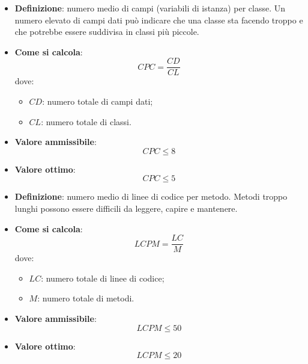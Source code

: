 \begin{itemize}
	\item \textbf{Definizione}: numero medio di campi (variabili di istanza) per classe. Un numero elevato di campi dati può indicare che una classe sta facendo troppo e che potrebbe essere suddivisa in classi più piccole.
	\item \textbf{Come si calcola}: \begin{equation*}CPC = \frac{CD}{CL}\end{equation*} dove:
		\begin{itemize}
			\item $CD$: numero totale di campi dati;
			\item $CL$: numero totale di classi.
		\end{itemize}
	\item \textbf{Valore ammissibile}: \begin{equation*}CPC \leq 8\end{equation*}
	\item \textbf{Valore ottimo}: \begin{equation*}CPC \leq 5\end{equation*}
\end{itemize}

\begin{itemize}
	\item \textbf{Definizione}: numero medio di linee di codice per metodo. Metodi troppo lunghi possono essere difficili da leggere, capire e mantenere.
	\item \textbf{Come si calcola}: \begin{equation*}LCPM = \frac{LC}{M}\end{equation*} dove:
		\begin{itemize}
			\item $LC$: numero totale di linee di codice;
			\item $M$: numero totale di metodi.
		\end{itemize}
	\item \textbf{Valore ammissibile}: \begin{equation*}LCPM \leq 50\end{equation*}
	\item \textbf{Valore ottimo}: \begin{equation*}LCPM \leq 20\end{equation*}
\end{itemize}

